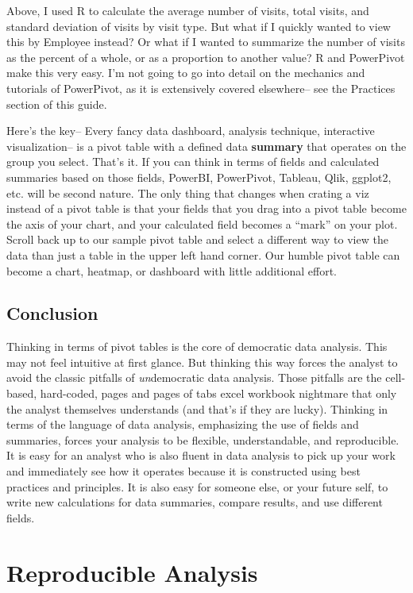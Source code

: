 \documentclass[
]{book}
\begin{document}
Above, I used R to calculate the average number of visits, total visits, and standard deviation of visits by visit type. But what if I quickly wanted to view this by Employee instead? Or what if I wanted to summarize the number of visits as the percent of a whole, or as a proportion to another value? R and PowerPivot make this very easy. I'm not going to go into detail on the mechanics and tutorials of PowerPivot, as it is extensively covered elsewhere-- see the Practices section of this guide.

Here's the key-- Every fancy data dashboard, analysis technique, interactive visualization-- is a pivot table with a defined data \textbf{summary} that operates on the group you select. That's it. If you can think in terms of fields and calculated summaries based on those fields, PowerBI, PowerPivot, Tableau, Qlik, ggplot2, etc. will be second nature. The only thing that changes when crating a viz instead of a pivot table is that your fields that you drag into a pivot table become the axis of your chart, and your calculated field becomes a ``mark'' on your plot. Scroll back up to our sample pivot table and select a different way to view the data than just a table in the upper left hand corner. Our humble pivot table can become a chart, heatmap, or dashboard with little additional effort.

\hypertarget{conclusion}{%
\section{Conclusion}\label{conclusion}}

Thinking in terms of pivot tables is the core of democratic data analysis. This may not feel intuitive at first glance. But thinking this way forces the analyst to avoid the classic pitfalls of \emph{un}democratic data analysis. Those pitfalls are the cell-based, hard-coded, pages and pages of tabs excel workbook nightmare that only the analyst themselves understands (and that's if they are lucky). Thinking in terms of the language of data analysis, emphasizing the use of fields and summaries, forces your analysis to be flexible, understandable, and reproducible. It is easy for an analyst who is also fluent in data analysis to pick up your work and immediately see how it operates because it is constructed using best practices and principles. It is also easy for someone else, or your future self, to write new calculations for data summaries, compare results, and use different fields.

\hypertarget{reproducible-analysis}{%
\chapter{Reproducible Analysis}\label{reproducible-analysis}}
\end{document}
